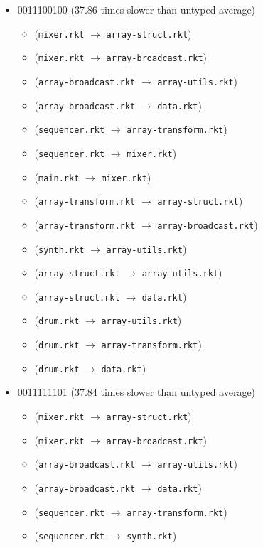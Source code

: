 \documentclass{article}
\newcommand{\mono}[1]{\texttt{#1}}
\begin{document}
\begin{itemize}
\item 0011100100 (37.86 times slower than untyped average)
  \begin{itemize}
  \item (\mono{mixer.rkt} $\rightarrow$ \mono{array-struct.rkt})
  \item (\mono{mixer.rkt} $\rightarrow$ \mono{array-broadcast.rkt})
  \item (\mono{array-broadcast.rkt} $\rightarrow$ \mono{array-utils.rkt})
  \item (\mono{array-broadcast.rkt} $\rightarrow$ \mono{data.rkt})
  \item (\mono{sequencer.rkt} $\rightarrow$ \mono{array-transform.rkt})
  \item (\mono{sequencer.rkt} $\rightarrow$ \mono{mixer.rkt})
  \item (\mono{main.rkt} $\rightarrow$ \mono{mixer.rkt})
  \item (\mono{array-transform.rkt} $\rightarrow$ \mono{array-struct.rkt})
  \item (\mono{array-transform.rkt} $\rightarrow$ \mono{array-broadcast.rkt})
  \item (\mono{synth.rkt} $\rightarrow$ \mono{array-utils.rkt})
  \item (\mono{array-struct.rkt} $\rightarrow$ \mono{array-utils.rkt})
  \item (\mono{array-struct.rkt} $\rightarrow$ \mono{data.rkt})
  \item (\mono{drum.rkt} $\rightarrow$ \mono{array-utils.rkt})
  \item (\mono{drum.rkt} $\rightarrow$ \mono{array-transform.rkt})
  \item (\mono{drum.rkt} $\rightarrow$ \mono{data.rkt})
  \end{itemize}
\item 0011111101 (37.84 times slower than untyped average)
  \begin{itemize}
  \item (\mono{mixer.rkt} $\rightarrow$ \mono{array-struct.rkt})
  \item (\mono{mixer.rkt} $\rightarrow$ \mono{array-broadcast.rkt})
  \item (\mono{array-broadcast.rkt} $\rightarrow$ \mono{array-utils.rkt})
  \item (\mono{array-broadcast.rkt} $\rightarrow$ \mono{data.rkt})
  \item (\mono{sequencer.rkt} $\rightarrow$ \mono{array-transform.rkt})
  \item (\mono{sequencer.rkt} $\rightarrow$ \mono{synth.rkt})

\end{itemize}
\end{itemize}
\end{document}
